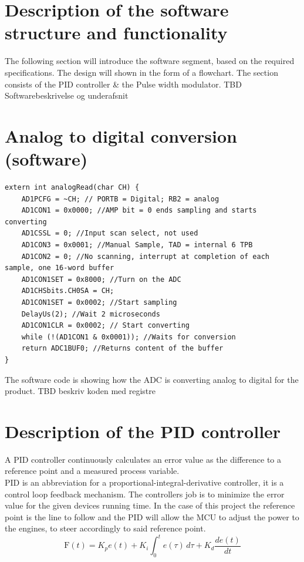 \section{Description of the software structure and functionality}

The following section will introduce the software segment, based on the required specifications. The design will shown in the form of a flowchart.
The section consists of the PID controller \& the Pulse width modulator.
TBD Softwarebeskrivelse og underafsnit

\section{Analog to digital conversion (software)}

\begin{lstlisting}
extern int analogRead(char CH) {
    AD1PCFG = ~CH; // PORTB = Digital; RB2 = analog
    AD1CON1 = 0x0000; //AMP bit = 0 ends sampling and starts converting
    AD1CSSL = 0; //Input scan select, not used
    AD1CON3 = 0x0001; //Manual Sample, TAD = internal 6 TPB
    AD1CON2 = 0; //No scanning, interrupt at completion of each sample, one 16-word buffer
    AD1CON1SET = 0x8000; //Turn on the ADC
    AD1CHSbits.CH0SA = CH;
    AD1CON1SET = 0x0002; //Start sampling
    DelayUs(2); //Wait 2 microseconds
    AD1CON1CLR = 0x0002; // Start converting
    while (!(AD1CON1 & 0x0001)); //Waits for conversion
    return ADC1BUF0; //Returns content of the buffer	
}
\end{lstlisting}
The software code is showing how the ADC is converting analog to digital for the product. TBD beskriv koden med registre


\section {Description of the PID controller} 
A PID controller continuously calculates an error value as the difference to a reference point and a measured process variable.\\
PID is an abbreviation for a proportional-integral-derivative controller, it is a control loop feedback mechanism. The controllers job is to minimize the error value for the given devices running time. In the case of this project the reference point is the line to follow and the PID will allow the MCU to adjust the power to the engines, to steer accordingly to said reference point.
$$\mathrm{F}(t)=K_p{e(t)} + K_{i}\int_{0}^{t}{e(\tau)}\,{d\tau} + K_{d}\frac{de(t)}{dt}$$

